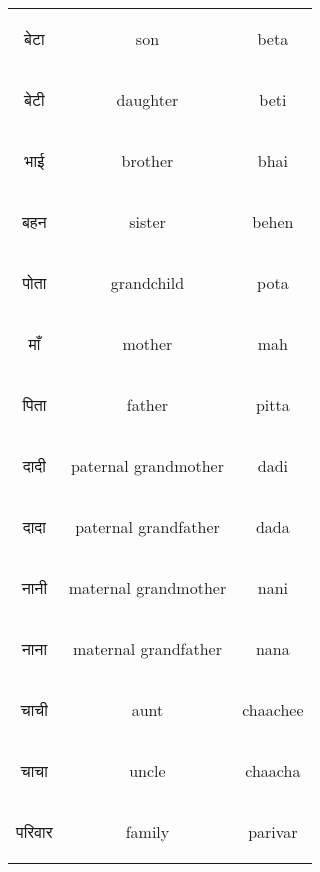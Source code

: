 \begin{table}[H]
    \centering
    \begin{tabular}{c|c|c}
        \begin{hindi} बेटा \end{hindi} & son & beta \\
        \begin{hindi} बेटी \end{hindi} & daughter & beti\\
        \begin{hindi} भाई \end{hindi} & brother & bhai\\
        \begin{hindi} बहन \end{hindi} & sister & behen\\
        \begin{hindi} पोता \end{hindi} & grandchild & pota\\
        \begin{hindi} माँ \end{hindi} & mother & mah\\
        \begin{hindi} पिता \end{hindi} & father & pitta\\
        \begin{hindi} दादी \end{hindi} & paternal grandmother & dadi\\
        \begin{hindi} दादा \end{hindi} & paternal grandfather & dada\\
        \begin{hindi} नानी  \end{hindi} & maternal grandmother & nani \\
        \begin{hindi} नाना \end{hindi} & maternal grandfather & nana \\
        \begin{hindi} चाची \end{hindi} & aunt & chaachee \\
        \begin{hindi} चाचा \end{hindi} & uncle & chaacha \\
        \begin{hindi} परिवार \end{hindi} & family & parivar\\

\end{tabular}
\end{table}
